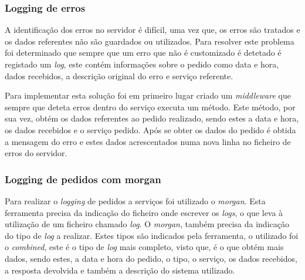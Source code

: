 \subsubsection{Logging de erros}

A identificação dos erros no servidor é difícil, uma vez que, os erros são tratados e os dados referentes não são guardados ou utilizados. Para resolver este problema foi determinado que sempre que um erro que não é customizado é detetado é registado um \textit{log}, este contém informações sobre o pedido como data e hora, dados recebidos, a descrição original do erro e serviço referente.

Para implementar esta solução foi em primeiro lugar criado um \textit{middleware} que sempre que deteta erros dentro do serviço executa um método. Este método, por sua vez, obtém os dados referentes ao pedido realizado, sendo estes a data e hora, os dados recebidos e o serviço pedido. Após se obter os dados do pedido é obtida a mensagem do erro e estes dados acrescentados numa nova linha no ficheiro de erros do servidor.

\subsubsection{Logging de pedidos com morgan}

Para realizar o \textit{logging} de pedidos a serviços foi utilizado o \textit{morgan}. Esta ferramenta precisa da indicação do ficheiro onde escrever os \textit{logs}, o que leva à utilização de um ficheiro chamado \textit{log}. O \textit{morgan}, também precisa da indicação do tipo de \textit{log} a realizar. Estes tipos são indicados pela ferramenta, o utilizado foi o \textit{combined}, este é o tipo de \textit{log} mais completo, visto que, é o que obtém mais dados, sendo estes, a data e hora do pedido, o tipo, o serviço, os dados recebidos, a resposta devolvida e também a descrição do sistema utilizado.